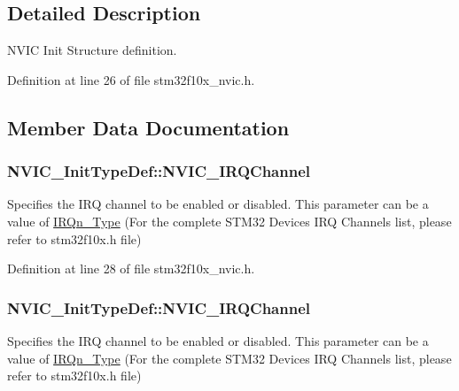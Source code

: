 \subsection{Detailed Description}
N\+V\+IC Init Structure definition. 

Definition at line 26 of file stm32f10x\+\_\+nvic.\+h.



\subsection{Member Data Documentation}
\subsubsection[{\texorpdfstring{N\+V\+I\+C\+\_\+\+I\+R\+Q\+Channel}{NVIC_IRQChannel}}]{ N\+V\+I\+C\+\_\+\+Init\+Type\+Def\+::\+N\+V\+I\+C\+\_\+\+I\+R\+Q\+Channel}\hypertarget{struct_n_v_i_c___init_type_def_a2309c52a0c88793d005fd43173129267}{}\label{struct_n_v_i_c___init_type_def_a2309c52a0c88793d005fd43173129267}
Specifies the I\+RQ channel to be enabled or disabled. This parameter can be a value of \hyperlink{group___configuration__section__for___c_m_s_i_s_gac3af4a32370fb28c4ade8bf2add80251}{I\+R\+Qn\+\_\+\+Type} (For the complete S\+T\+M32 Devices I\+RQ Channels list, please refer to stm32f10x.\+h file) 

Definition at line 28 of file stm32f10x\+\_\+nvic.\+h.

\subsubsection[{\texorpdfstring{N\+V\+I\+C\+\_\+\+I\+R\+Q\+Channel}{NVIC_IRQChannel}}]{ N\+V\+I\+C\+\_\+\+Init\+Type\+Def\+::\+N\+V\+I\+C\+\_\+\+I\+R\+Q\+Channel}\hypertarget{struct_n_v_i_c___init_type_def_afa04cf6e559bb690bdd9fcb7e3d93dcf}{}\label{struct_n_v_i_c___init_type_def_afa04cf6e559bb690bdd9fcb7e3d93dcf}
Specifies the I\+RQ channel to be enabled or disabled. This parameter can be a value of \hyperlink{group___configuration__section__for___c_m_s_i_s_gac3af4a32370fb28c4ade8bf2add80251}{I\+R\+Qn\+\_\+\+Type} (For the complete S\+T\+M32 Devices I\+RQ Channels list, please refer to stm32f10x.\+h file) 

